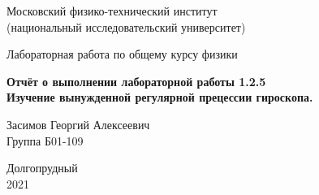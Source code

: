 



\begin{titlepage}

    \newpage
    \begin{center}
        \normalsize Московский физико-технический институт \\(национальный исследовательский университет)
    \end{center}

    \vspace{6em}

    \begin{center}
        \Large Лабораторная работа по общему курсу физики\\
    \end{center}

    \vspace{1em}

    \begin{center}
        \Large \textbf{Отчёт о выполнении лабораторной работы 1.2.5\\ {Изучение вынужденной регулярной прецессии гироскопа.}}
    \end{center}

    \vspace{2em}

    \begin{center}
        \large Засимов Георгий Алексеевич \\
        Группа Б01-109
    \end{center}

    \vspace{\fill}

    \begin{center}
    Долгопрудный \\2021
    \end{center}
    
\end{titlepage}

\newpage




